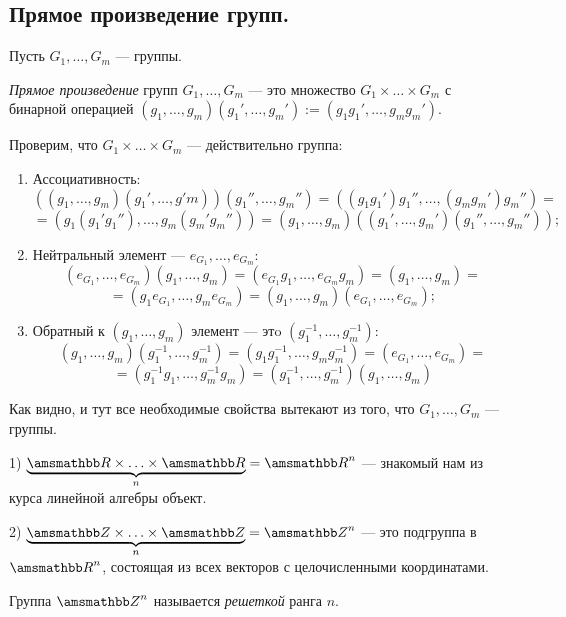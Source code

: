 \mysection
\subsection{Прямое произведение групп.}

Пусть $G_1 , \ldots , G_m$ --- группы.

\begin{definition}\label{de:9:1}
    \textit{Прямое произведение} групп $G_1, \ldots , G_m$ --- это множество
    $G_1 \times \ldots \times G_m$ с бинарной операцией
    $(g_1, \ldots , g_m)(g_1', \ldots , g_m') := (g_1g_1', \ldots , g_mg_m')$.
\end{definition}

Проверим, что $G_1 \times \ldots \times G_m$ --- действительно группа:

\begin{enumerate}
    \item Ассоциативность:
    \[
        ((g_1, \ldots , g_m)(g_1', \ldots , g'm))(g_1'',\ldots ,g_m'') =
        ((g_1g_1')g_1'', \ldots , (g_mg_m')g_m'') = 
    \]
    \[
        = (g_1(g_1'g_1''), \ldots , g_m(g_m'g_m'')) = 
        (g_1, \ldots , g_m)((g_1', \ldots , g_m')(g_1'', \ldots , g_m''));
    \]
    \item Нейтральный элемент --- $e_{G_1}, \ldots , e_{G_m}$:
    \[
        (e_{G_1}, \ldots , e_{G_m})(g_1, \ldots , g_m) = 
        (e_{G_1}g_1, \ldots , e_{G_m}g_m) = (g_1, \ldots , g_m) = 
    \]
    \[
        = (g_1e_{G_1}, \ldots , g_me_{G_m}) = 
        (g_1, \ldots , g_m)(e_{G_1}, \ldots , e_{G_m});
    \]
    \item Обратный к $(g_1, \ldots , g_m)$ элемент --- этo
    $(g_1^{-1}, \ldots , g_m^{-1})$:
    \[
        (g_1, \ldots , g_m)(g_1^{-1}, \ldots , g_m^{-1}) = 
        (g_1g_1^{-1}, \ldots , g_mg_m^{-1}) = (e_{G_1}, \ldots , e_{G_m}) =
    \]
    \[
        = (g_1^{-1}g_1, \ldots , g_m^{-1}g_m) = 
        (g_1^{-1}, \ldots , g_m^{-1})(g_1, \ldots , g_m)
    \]
\end{enumerate}

Как видно, и тут все необходимые свойства вытекают из того, что
$G_1, \ldots , G_m$ --- группы.

\begin{example}
    1) $\underbrace{\RR \times \ldots \times \RR}_{n} = \RR^n$ ---
    знакомый нам из курса линейной алгебры объект.

    2) $\underbrace{\ZZ \times \ldots \times \ZZ}_{n} = \ZZ^n$ ---
    это подгруппа в $\RR^n$, состоящая из всех векторов с целочисленными
    координатами.

    Группа $\ZZ^n$ называется \textit{решеткой} ранга $n$.
\end{example}

